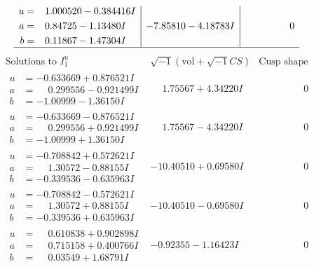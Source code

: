 \documentclass[1p]{elsarticle_modified}
\theoremstyle{definition}
\newcommand{\I}{\sqrt{-1}}
\begin{document}
$$\begin{array}{c|c|c}
\begin{aligned}
u &= \phantom{-}1.000520 - 0.384416 I \\
a &= \phantom{-}0.84725 - 1.13480 I \\
b &= \phantom{-}0.11867 - 1.47304 I\end{aligned}
 & -7.85810 - 4.18783 I & \phantom{-0.000000 } 0\\
 \hline 
 \end{array}$$\newpage$$\begin{array}{c|c|c}  
\text{Solutions to }I^u_{1}& \I (\text{vol} + \sqrt{-1}CS) & \text{Cusp shape}\\
 \hline 
\begin{aligned}
u &= -0.633669 + 0.876521 I \\
a &= \phantom{-}0.299556 - 0.921499 I \\
b &= -1.00999 - 1.36150 I\end{aligned}
 & \phantom{-}1.75567 + 4.34220 I & \phantom{-0.000000 } 0 \\ \hline\begin{aligned}
u &= -0.633669 - 0.876521 I \\
a &= \phantom{-}0.299556 + 0.921499 I \\
b &= -1.00999 + 1.36150 I\end{aligned}
 & \phantom{-}1.75567 - 4.34220 I & \phantom{-0.000000 } 0 \\ \hline\begin{aligned}
u &= -0.708842 + 0.572621 I \\
a &= \phantom{-}1.30572 - 0.88155 I \\
b &= -0.339536 - 0.635963 I\end{aligned}
 & -10.40510 + 0.69580 I & \phantom{-0.000000 } 0 \\ \hline\begin{aligned}
u &= -0.708842 - 0.572621 I \\
a &= \phantom{-}1.30572 + 0.88155 I \\
b &= -0.339536 + 0.635963 I\end{aligned}
 & -10.40510 - 0.69580 I & \phantom{-0.000000 } 0 \\ \hline\begin{aligned}
u &= \phantom{-}0.610838 + 0.902898 I \\
a &= \phantom{-}0.715158 + 0.400766 I \\
b &= \phantom{-}0.03549 + 1.68791 I\end{aligned}
 & -0.92355 - 1.16423 I & \phantom{-0.000000 } 0 \\ \hline\begin{aligned}

\end{aligned}
\end{array}$$
\end{document}
